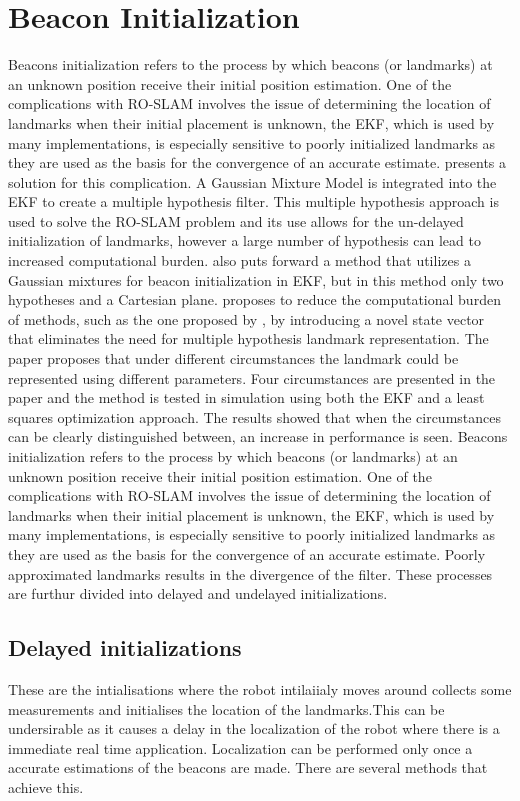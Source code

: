 \documentclass[conference]{IEEEtran}
\begin{document}
	\section{Beacon Initialization}
	Beacons initialization refers to the process by which beacons (or landmarks) at an unknown position receive their initial position estimation. One of the complications with RO-SLAM involves the issue of determining the location of landmarks when their initial placement is unknown, the EKF, which is used by many implementations, is especially sensitive to poorly initialized landmarks as they are used as the basis for the convergence of an accurate estimate. \cite{Caballero2010} presents a solution for this complication. A Gaussian Mixture Model is integrated into the EKF to create a multiple hypothesis filter.  This multiple hypothesis approach is used to solve the RO-SLAM problem and its use allows for the un-delayed initialization of landmarks, however a large number of hypothesis can lead to increased computational burden. \cite{Geneve2015} also puts forward a method that utilizes a Gaussian mixtures for beacon initialization in EKF, but in this method only two hypotheses and a Cartesian plane. \cite{Ahmad2011a} proposes to reduce the computational burden of methods, such as the one proposed by \cite{Caballero2010}, by introducing a novel state vector that eliminates the need for multiple hypothesis landmark representation. The paper proposes that under different circumstances the landmark could be represented using different parameters. Four circumstances are presented in the paper and the method is tested in simulation using both the EKF and a least squares optimization approach. The results showed that when the circumstances can be clearly distinguished between, an increase in performance is seen.
	Beacons initialization refers to the process by which beacons (or landmarks) at an unknown position receive their initial position estimation. One of the complications with RO-SLAM involves the issue of determining the location of landmarks when their initial placement is unknown, the EKF, which is used by many implementations, is especially sensitive to poorly initialized landmarks as they are used as the basis for the convergence of an accurate estimate. Poorly approximated landmarks results in the divergence of the filter. These processes are furthur  divided into delayed and undelayed initializations.
	\subsection{Delayed initializations}
	These are the intialisations where  the robot intilaiialy moves around collects some measurements and initialises the location of the landmarks.This can be undersirable as it causes a delay in the localization of the robot where there is a immediate real time application. Localization can be performed only once a accurate estimations of the beacons are made. There are several methods that achieve this. 
\end{document}
